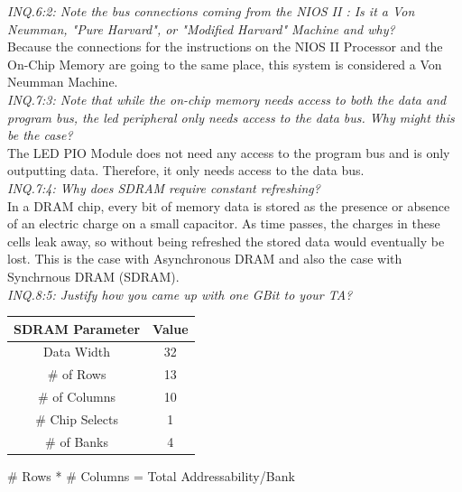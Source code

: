 \documentclass[journal, twocolumn, final,11pt,letterpaper]{IEEEtran}
\begin{document}
\textit{INQ.6:2: Note the bus connections coming from the NIOS II : Is it a Von Neumman, "Pure Harvard", or "Modified Harvard" Machine and why?} \\

Because the connections for the instructions on the NIOS II Processor and the On-Chip Memory are going to the same place, this system is considered a Von Neumman Machine. \\

\textit{INQ.7:3: Note that while the on-chip memory needs access to both the data and program bus, the led peripheral only needs access to the data bus. Why might this be the case?} \\

The LED PIO Module does not need any access to the program bus and is only outputting data. Therefore, it only needs access to the data bus. \\

\textit{INQ.7:4: Why does SDRAM require constant refreshing?} \\

In a DRAM chip, every bit of memory data is stored as the presence or absence of an electric charge on a small capacitor. As time passes, the charges in these cells leak away, so without being refreshed the stored data would eventually be lost. This is the case with Asynchronous DRAM and also the case with Synchrnous DRAM (SDRAM). \\

\textit{INQ.8:5: Justify how you came up with one GBit to your TA?} \\

\begin{table}[htbp]
	\centering
	\begin{tabular}{c|c}	%
		\toprule	%
		SDRAM Parameter & Value \\
		\midrule
		Data Width & 32 \\
		\# of Rows & 13\\
		\# of Columns & 10 \\
		\# Chip Selects & 1 \\
		\# of Banks & 4 \\
		\bottomrule	%
	\end{tabular}%
\end{table}%

\# Rows * \# Columns = Total Addressability/Bank  \\
\end{document}
